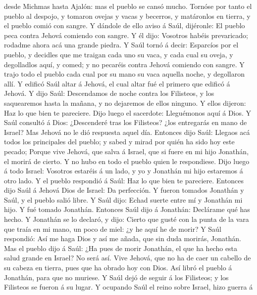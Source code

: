 desde Michmas hasta Ajalón: mas el pueblo se cansó mucho.
 Tornóse por tanto el pueblo al despojo, y tomaron ovejas
y vacas y becerros, y matáronlos en tierra, y el pueblo comió con
sangre.  Y dándole de ello aviso á Saúl, dijéronle: El
pueblo peca contra Jehová comiendo con sangre. Y él dijo: Vosotros
habéis prevaricado; rodadme ahora acá una grande piedra. 
Y Saúl tornó á decir: Esparcíos por el pueblo, y decidles que me traigan
cada uno su vaca, y cada cual su oveja, y degolladlos aquí, y comed; y
no pecaréis contra Jehová comiendo con sangre. Y trajo todo el pueblo
cada cual por su mano su vaca aquella noche, y degollaron allí.
 Y edificó Saúl altar á Jehová, el cual altar fué el
primero que edificó á Jehová.  Y dijo Saúl: Descendamos
de noche contra los Filisteos, y los saquearemos hasta la mañana, y no
dejaremos de ellos ninguno. Y ellos dijeron: Haz lo que bien te
pareciere. Dijo luego el sacerdote: Lleguémonos aquí á Dios.
 Y Saúl consultó á Dios: ¿Descenderé tras los Filisteos?
¿los entregarás en mano de Israel? Mas Jehová no le dió respuesta aquel
día.  Entonces dijo Saúl: Llegaos acá todos los
principales del pueblo; y sabed y mirad por quién ha sido hoy este
pecado;  Porque vive Jehová, que salva á Israel, que si
fuere en mi hijo Jonathán, el morirá de cierto. Y no hubo en todo el
pueblo quien le respondiese.  Dijo luego á todo Israel:
Vosotros estaréis á un lado, y yo y Jonathán mi hijo estaremos á otro
lado. Y el pueblo respondió á Saúl: Haz lo que bien te pareciere.
 Entonces dijo Saúl á Jehová Dios de Israel: Da
perfección. Y fueron tomados Jonathán y Saúl, y el pueblo salió libre.
 Y Saúl dijo: Echad suerte entre mí y Jonathán mi hijo. Y
fué tomado Jonathán.  Entonces Saúl dijo á Jonathán:
Declárame qué has hecho. Y Jonathán se lo declaró, y dijo: Cierto que
gusté con la punta de la vara que traía en mi mano, un poco de miel: ¿y
he aquí he de morir?  Y Saúl respondió: Así me haga Dios
y así me añada, que sin duda morirás, Jonathán.  Mas el
pueblo dijo á Saúl: ¿Ha pues de morir Jonathán, el que ha hecho esta
salud grande en Israel? No será así. Vive Jehová, que no ha de caer un
cabello de su cabeza en tierra, pues que ha obrado hoy con Dios. Así
libró el pueblo á Jonathán, para que no muriese.  Y Saúl
dejó de seguir á los Filisteos; y los Filisteos se fueron á su lugar.
 Y ocupando Saúl el reino sobre Israel, hizo guerra á
